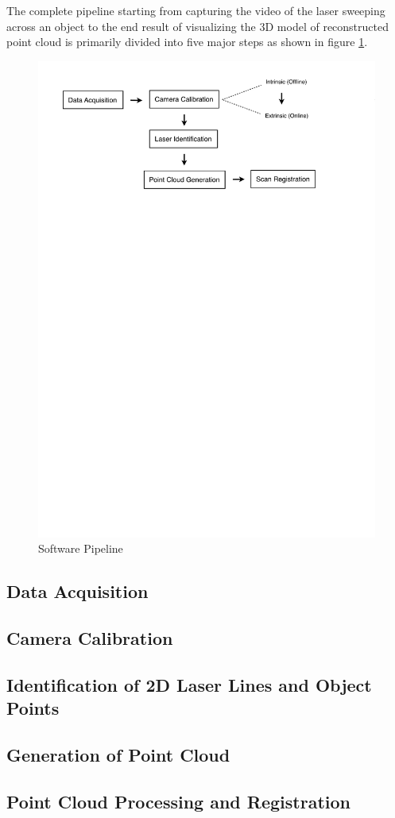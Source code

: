 The complete pipeline starting from capturing the video of the laser sweeping
across an object to the end result of visualizing the 3D model of
reconstructed point cloud is primarily divided into five major steps as shown
in figure \ref{figure:pipeline}.

\begin{figure}[ht!]
\centering
\includegraphics[width=0.8\linewidth]{figures/pipeline}
\caption{Software Pipeline}
\label{figure:pipeline}
\end{figure}

\subsection{Data Acquisition}
\label{subsection:data-acquistion}


\subsection{Camera Calibration}
\label{subsection:camera-calibration}


\subsection{Identification of 2D Laser Lines and Object Points}
\label{subsection:search-laser}


\subsection{Generation of Point Cloud}
\label{subsection:generate-pointcloud}


\subsection{Point Cloud Processing and Registration}
\label{subsection:registration}

